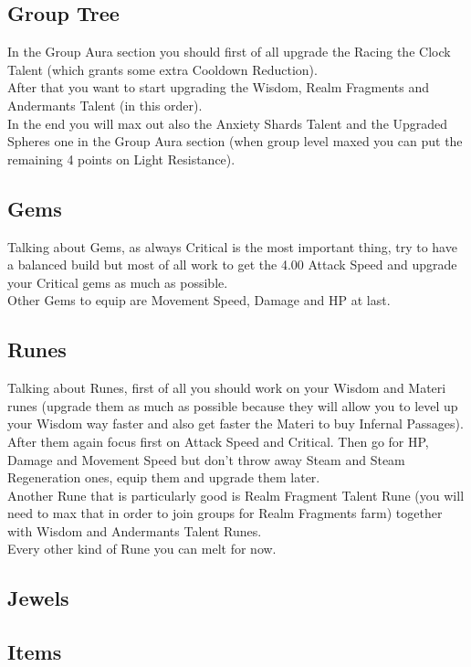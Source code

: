 \documentclass[12pt]{article}
\begin{document}
\subsection{Group Tree}
In the Group Aura section you should first of all upgrade the Racing the Clock Talent (which grants some extra Cooldown Reduction). \\
After that you want to start upgrading the Wisdom, Realm Fragments and Andermants Talent (in this order). \\
In the end you will max out also the Anxiety Shards Talent and the Upgraded Spheres one in the Group Aura section (when group level maxed you can put the remaining 4 points on Light Resistance).

\subsection{Gems}
Talking about Gems, as always Critical is the most important thing, try to have a balanced build but most of all work to get the 4.00 Attack Speed and upgrade your Critical gems as much as possible. \\
Other Gems to equip are Movement Speed, Damage and HP at last.

\subsection{Runes}
Talking about Runes, first of all you should work on your Wisdom and Materi runes (upgrade them as much as possible because they will allow you to level up your Wisdom way faster and also get faster the Materi to buy Infernal Passages). \\
After them again focus first on Attack Speed and Critical. Then go for HP, Damage and Movement Speed but don't throw away Steam and Steam Regeneration ones, equip them and upgrade them later. \\
Another Rune that is particularly good is Realm Fragment Talent Rune (you will need to max that in order to join groups for Realm Fragments farm) together with Wisdom and Andermants Talent Runes. \\
Every other kind of Rune you can melt for now.

\subsection{Jewels}

\subsection{Items}
\end{document}
